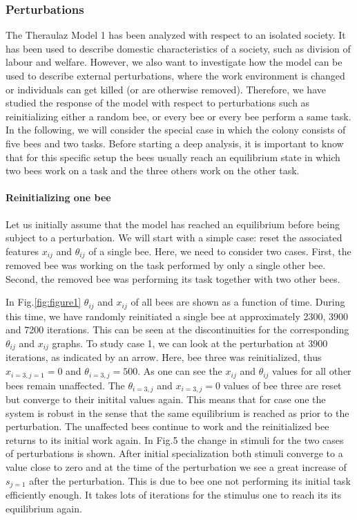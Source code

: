 \subsubsection{Perturbations}
The Theraulaz Model 1 has been analyzed with respect to an isolated society. It has been used to describe domestic characteristics of a society, such as division of labour and welfare. However, we also want to investigate how the model can be used to describe external perturbations, where the work environment is changed or individuals can get killed (or are otherwise removed). Therefore, we have studied the response of the model with respect to perturbations such as reinitializing either a random bee, or every bee or every bee perform a same task.
In the following, we will consider the special case in which the colony consists of five bees and two tasks. Before starting a deep analysis, it is important to know that for this specific setup the bees usually reach an equilibrium state in which two bees work on a task and the three others work on the other task. 

\paragraph{Reinitializing one bee}

Let us initially assume that the model has reached an equilibrium before being subject to a perturbation. We will start with a simple case: reset the associated features $x_{ij}$ and $\theta_{ij}$ of a single bee. Here, we need to consider two cases. First, the removed bee was working on the task performed by only a single other bee. Second, the removed bee was performing its task together with two other bees.

In Fig.\ref{fig:figure1} $\theta_{ij}$ and $x_{ij}$ of all bees are shown as a function of time. During this time, we have randomly reinitiated a single bee at approximately 2300, 3900 and 7200 iterations. This can be seen at the discontinuities for the corresponding $\theta_{ij}$ and $x_{ij}$ graphs. To study case 1, we can look at the perturbation at 3900 iterations, as indicated by an arrow. Here, bee three was reinitialized, thus $x_{i=3,j=1}=0$ and $\theta_{i=3,j}=500$. As one can see the $x_{ij}$ and $\theta_{ij}$ values for all other bees remain unaffected. The $\theta_{i=3,j}$ and $x_{i=3,j}=0$ values of bee three are reset but converge to their initital values again. This means that for case one the system is robust in the sense that the same equilibrium is reached as prior to the perturbation. The unaffected bees continue to work and the reinitialized bee returns to its initial work again. In Fig.5 the change in stimuli for the two cases of perturbations is shown. After initial specialization both stimuli converge to a value close to zero and at the time of the perturbation we see a great increase of $s_{j=1}$ after the perturbation. This is due to bee one not performing its initial task efficiently enough. It takes lots of iterations for the stimulus one to reach its its equilibrium again. 

